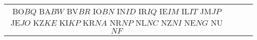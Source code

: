 \begin{tabular}{ c | c | c | c | }
BO$ %
BQ$ %
BA$ %
BW$ %
BV$ %
BR$ %
IO$ %
BN$ %
IN$ %
ID$ %
IR$ %
IQ$ %
IE$ %
IM$ %
IL$ %
IT$ %
JM$ %
JP$ %
JE$ %
JO$ %
KZ$ %
KE$ %
KI$ %
KP$ %
KR$ %
NA$ %
NR$ %
NP$ %
NL$ %
NC$ %
NZ$ %
NI$ %
NE$ %
NG$ %
NU$ %
NF$ %

\end{tabular}
